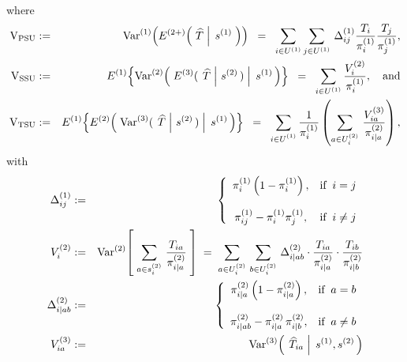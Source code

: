 \begin{theorem}
\begin{enumerate}
\begin{eqnarray*}
{{}}
\end{eqnarray*}
where
\begin{eqnarray*}
\textnormal{V}_{\textnormal{PSU}}
&:=&\Var^{(1)}\!\left(E^{(2+)}\!\left(\,\left.\widehat{T}\;\right\vert\;s^{(1)}\;\right)\right)
\;\;=\;\;
\sum_{i\in U^{(1)}}\sum_{j\in U^{(1)}}\,\Delta^{(1)}_{ij}\frac{T_{i}}{\pi^{(1)}_{i}}\frac{T_{j}}{\pi^{(1)}_{j}},
\\
\textnormal{V}_{\textnormal{SSU}}
&:=&
E^{(1)}\!\left\{\Var^{(2)}\!\left(\,\left.E^{(3)}(\;\left.\widehat{T}\;\right\vert\,s^{(2)}\,)\;\right\vert\;s^{(1)}\,\right)\right\}
\;\;=\;\;
\sum_{i\in U^{(1)}}\frac{V^{(2)}_{i}}{\pi^{(1)}_{i}},
\quad\textnormal{and}
\\
\textnormal{V}_{\textnormal{TSU}}
&:=&
E^{(1)}\!\left\{E^{(2)}\!\left(\,\left.\Var^{(3)}(\;\left.\widehat{T}\;\right\vert\,s^{(2)}\,)\;\right\vert\;s^{(1)}\,\right)\right\}
\;\;=\;\;
\sum_{i\in U^{(1)}_{\color{white}i}}\dfrac{1}{\pi^{(1)}_{i}}\left(\sum_{a \in U^{(2)}_{i}}\,\dfrac{V^{(3)}_{ia}}{\pi^{(2)}_{i \vert a}}\right),
\end{eqnarray*}
with
\begin{eqnarray*}
\Delta^{(1)}_{ij}
&:=&
\left\{
\begin{array}{cl}
\pi^{(1)}_{i}\left(1 - \pi^{(1)}_{i}\right), & \textnormal{if}\;\; i = j
\\ \\
\pi^{(1)}_{ij} - \pi^{(1)}_{i}\pi^{(1)}_{j}, & \textnormal{if}\;\; i \neq j
\end{array}
\right.
\\
V^{(2)}_{i}
&:=& \textnormal{Var}^{(2)}\!\left[\;\sum_{a\in s^{(2)}_{i}}\,\dfrac{T_{ia}}{\pi^{(2)}_{i \vert a}}\;\right]
\;=\; \sum_{a\in U^{(2)}_{i}}\,\sum_{b\in U^{(2)}_{i}}\,\Delta^{(2)}_{i \vert ab}\cdot\dfrac{T_{ia}}{\pi^{(2)}_{i \vert a}}\cdot\dfrac{T_{ib}}{\pi^{(2)}_{i \vert b}}
\\
\Delta^{(2)}_{i \vert ab}
&:=&
\left\{
\begin{array}{cl}
\pi^{(2)}_{i \vert a}\left(1 - \pi^{(2)}_{i\vert a}\right), & \textnormal{if}\;\; a = b
\\ \\
\pi^{(2)}_{i \vert ab} - \pi^{(2)}_{i \vert a}\,\pi^{(2)}_{i \vert b}, & \textnormal{if}\;\; a \neq b
\end{array}
\right.
\\
V^{(3)}_{ia}
&:=&
\textnormal{Var}^{(3)}\!\left(\;\left.\widehat{T}_{ia}\;\right\vert\;s^{(1)}, s^{(2)}\,\right)
\end{eqnarray*}

\end{enumerate}
\end{theorem}
